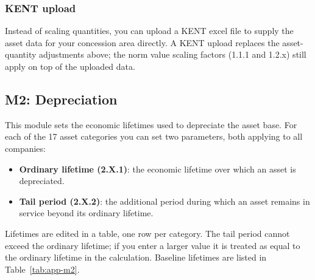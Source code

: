 \subsubsection{KENT upload}
Instead of scaling quantities, you can upload a KENT excel file to supply the asset data for your concession area directly. A KENT upload replaces the asset-quantity adjustments above; the norm value scaling factors (1.1.1 and 1.2.x) still apply on top of the uploaded data.


\subsection{M2: Depreciation}
\label{sec:spec-m2}

This module sets the economic lifetimes used to depreciate the asset base. For each of the 17 asset categories you can set two parameters, both applying to all companies:

\begin{itemize}
  \item \textbf{Ordinary lifetime (2.X.1)}: the economic lifetime over which an asset is depreciated.
  \item \textbf{Tail period (2.X.2)}: the additional period during which an asset remains in service beyond its ordinary lifetime.
\end{itemize}

\noindent Lifetimes are edited in a table, one row per category. The tail period cannot exceed the ordinary lifetime; if you enter a larger value it is treated as equal to the ordinary lifetime in the calculation. Baseline lifetimes are listed in Table~\ref{tab:app-m2}.

